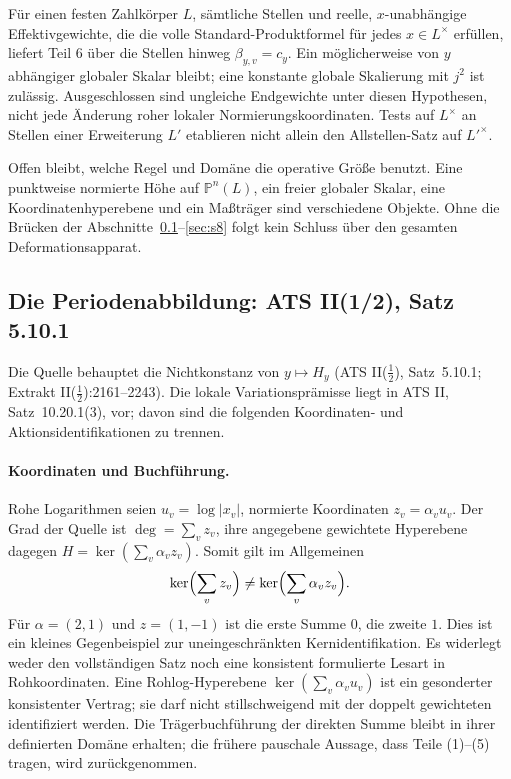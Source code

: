 \documentclass[11pt,a4paper]{article}
\theoremstyle{definition}
\theoremstyle{remark}
\begin{document}
Für einen festen Zahlkörper $L$, sämtliche Stellen und reelle,
$x$-unabhängige Effektiv\-gewichte, die die volle Standard-Produktformel für
jedes $x\in L^\times$ erfüllen, liefert Teil 6 über die Stellen hinweg
$\beta_{y,v}=c_y$. Ein möglicherweise von $y$ abhängiger globaler Skalar
bleibt; eine konstante globale Skalierung mit $j^2$ ist zulässig. Ausgeschlossen
sind ungleiche Endgewichte unter diesen Hypothesen, nicht jede Änderung
roher lokaler Normierungskoordinaten. Tests auf $L^\times$ an Stellen einer
Erweiterung $L'$ etablieren nicht allein den Allstellen-Satz auf $L'^\times$.

Offen bleibt, welche Regel und Domäne die operative Größe benutzt. Eine
punktweise normierte Höhe auf $\mathbb P^n(L)$, ein freier globaler Skalar,
eine Koordinatenhyperebene und ein Maßträger sind verschiedene Objekte.
Ohne die Brücken der Abschnitte~\ref{sec:s18}--\ref{sec:s8} folgt kein
Schluss über den gesamten Deformationsapparat.

\subsection{Die Periodenabbildung: ATS II(1/2), Satz 5.10.1}\label{sec:s18}

Die Quelle behauptet die Nichtkonstanz von $y\mapsto H_y$ (ATS II($\tfrac12$),
Satz~5.10.1; Extrakt II($\tfrac12$):2161--2243). Die lokale
Variationsprämisse liegt in ATS II, Satz~10.20.1(3), vor; davon sind die
folgenden Koordinaten- und Aktionsidentifikationen zu trennen.

\paragraph{Koordinaten und Buchführung.}
Rohe Logarithmen seien $u_v=\log|x_v|$, normierte Koordinaten
$z_v=\alpha_v u_v$. Der Grad der Quelle ist $\deg=\sum_v z_v$, ihre
angegebene gewichtete Hyperebene dagegen $H=\ker(\sum_v\alpha_v z_v)$.
Somit gilt im Allgemeinen
\[
 \ker\Bigl(\sum_v z_v\Bigr)\ne
 \ker\Bigl(\sum_v\alpha_v z_v\Bigr).
\]
Für $\alpha=(2,1)$ und $z=(1,-1)$ ist die erste Summe $0$, die zweite $1$.
Dies ist ein kleines Gegenbeispiel zur uneingeschränkten Kernidentifikation.
Es widerlegt weder den vollständigen Satz noch eine konsistent
formulierte Lesart in Rohkoordinaten.
Eine Rohlog-Hyperebene $\ker(\sum_v\alpha_v u_v)$ ist ein gesonderter
konsistenter Vertrag; sie darf nicht stillschweigend mit der doppelt
gewichteten identifiziert werden. Die Trägerbuchführung der direkten Summe
bleibt in ihrer definierten Domäne erhalten; die frühere pauschale Aussage,
dass Teile (1)--(5) tragen, wird zurückgenommen.
\end{document}

